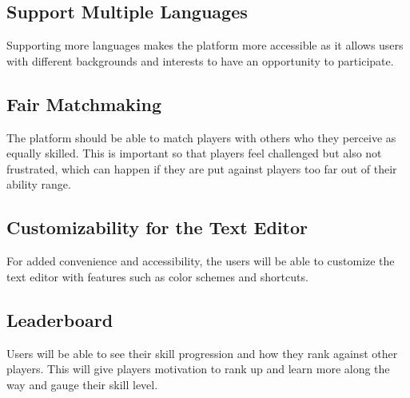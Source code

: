 \documentclass{article}
\begin{document}
\subsection{Support Multiple Languages}
Supporting more languages makes the platform more accessible as it allows users with different backgrounds and interests to have an opportunity to participate.

\subsection{Fair Matchmaking}
The platform should be able to match players with others who they perceive as equally skilled. This is important so that players feel challenged but also not frustrated, which can happen if they are put against players too far out of their ability range.

\subsection{Customizability for the Text Editor}
For added convenience and accessibility, the users will be able to customize the text editor with features such as color schemes and shortcuts.

\subsection{Leaderboard}
Users will be able to see their skill progression and how they rank against other players. This will give players motivation to rank up and learn more along the way and gauge their skill level.
\end{document}
